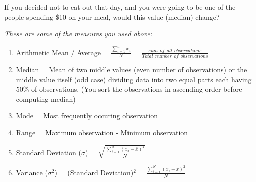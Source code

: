 \documentclass[10pt]{article}
\begin{document}
\begin{enumerate}
	If you decided not to eat out that day, and you were going to be one of the people spending \$10 on your meal, would this value (median) change?
	\vspace{2cm}
	
\end{enumerate}	

\emph{These are some of the measures you used above:}

\vspace{0.5cm}
\begin{enumerate}
	\item Arithmetic Mean / Average = $\frac{\sum_{i=1}^{n}x_i}{N}$ = $\frac{sum \hspace{5pt} of \hspace{5pt} all \hspace{5pt} observations}{Total \hspace{5pt} number \hspace{5pt} of \hspace{5pt} observations}$
	\vspace{0.3cm}
	
	\item Median = Mean of two middle values (even number of observations) or the middle value itself (odd case) dividing data into two equal parts each having 50\% of observations. (You sort the observations in ascending order before computing median)
	\vspace{0.3cm}
	\item Mode = Most frequently occuring observation
	\vspace{0.3cm}
	\item Range = Maximum observation - Minimum observation
	\vspace{0.3cm}
	\item Standard Deviation ($\sigma$) = $\sqrt{\frac{\sum_{i=1}^{N}(x_i - \bar{x})^2}{N}}$
	\vspace{0.3cm}
	\item Variance ($\sigma^2$) = (Standard Deviation)$^2$ = $\frac{\sum_{i=1}^{N}(x_i - \bar{x})^2}{N}$

\end{enumerate}  
\end{document}
